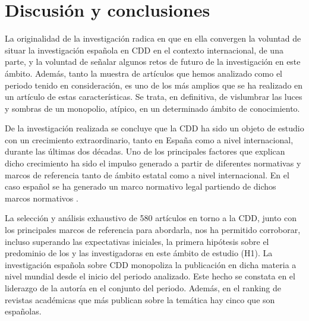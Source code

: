 \documentclass[spanish]{textolivre}
\begin{document}
\section{Discusión y conclusiones}\label{sec-4}

La originalidad de la investigación radica en que en ella convergen la voluntad de situar la investigación española en CDD en el contexto internacional, de una parte, y la voluntad de señalar algunos retos de futuro de la investigación en este ámbito. Además, tanto la muestra de artículos que hemos analizado como el periodo tenido en consideración, es uno de los más amplios que se ha realizado en un artículo de estas características. Se trata, en definitiva, de vislumbrar las luces y sombras de un monopolio, atípico, en un determinado ámbito de conocimiento. 

De la investigación realizada se concluye que la CDD ha sido un objeto de estudio con un crecimiento extraordinario, tanto en España como a nivel internacional, durante las últimas dos décadas. Uno de los principales factores que explican dicho crecimiento ha sido el impulso generado a partir de diferentes normativas y marcos de referencia tanto de ámbito estatal como a nivel internacional. En el caso español se ha generado un marco normativo legal partiendo de dichos marcos normativos \cite{boe2022b, boe2022a, intef2017, redecker2017, unesco2018}.

La selección y análisis exhaustivo de 580 artículos en torno a la CDD, junto con los principales marcos de referencia para abordarla, nos ha permitido corroborar, incluso superando las expectativas iniciales, la primera hipótesis sobre el predominio de los y las investigadoras en este ámbito de estudio (H1). La investigación española sobre CDD monopoliza la publicación en dicha materia a nivel mundial desde el inicio del periodo analizado. Este hecho se constata en el liderazgo de la autoría en el conjunto del periodo. Además, en el ranking de revistas académicas que más publican sobre la temática hay cinco que son españolas.
\end{document}

